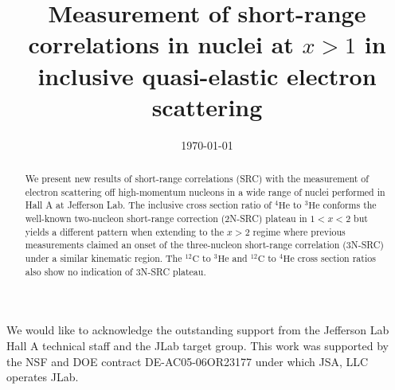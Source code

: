 \documentclass[
reprint, superscriptaddress,
	showpacs,
	amsmath,amssymb,
	aps,
	prl,
	floatfix,
	]{revtex4-1}
\begin{document}
	\title{Measurement of short-range correlations in nuclei at $x>1$ in inclusive quasi-elastic
		electron scattering}

		

		\date{\today}

		\begin{abstract}
		We present new results of short-range correlations (SRC) with the measurement of electron scattering off high-momentum nucleons in a wide range of nuclei performed in Hall A at Jefferson Lab. The inclusive cross section ratio of $\mathrm{^{4}He}$ to $\mathrm{^{3}He}$ conforms the well-known two-nucleon short-range correction (2N-SRC) plateau in $1<x<2$ but yields a different pattern when extending to the $x>2$ regime where previous measurements claimed an onset of the three-nucleon short-range correlation (3N-SRC) under a similar kinematic region. The $\mathrm{^{12}C}$ to $\mathrm{^{3}He}$ and $\mathrm{^{12}C}$ to $\mathrm{^{4}He}$ cross section ratios also show no indication of 3N-SRC plateau. 
		\end{abstract}


		\maketitle

		

		
		

		

		\begin{acknowledgments}
 We would like to acknowledge the outstanding support from the Jefferson Lab Hall A 
technical staff and the JLab target group. This work was supported by the NSF and DOE 
contract DE-AC05-06OR23177 under which JSA, LLC operates JLab.
		\end{acknowledgments}

		
		

		
\end{document}
